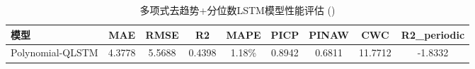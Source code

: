 \begin{table}[htbp]
\centering
\caption{多项式去趋势+分位数LSTM模型性能评估 ()}
\label{tab:poly_qlstm_performance}
\begin{tabular}{lcccccccc}
\toprule
模型 & MAE & RMSE & R2 & MAPE & PICP & PINAW & CWC & R2_periodic \\
\midrule
Polynomial-QLSTM & 4.3778 & 5.5688 & 0.4398 & 1.18\% & 0.8942 & 0.6811 & 11.7712 & -1.8332 \\
\bottomrule
\end{tabular}
\end{table}
